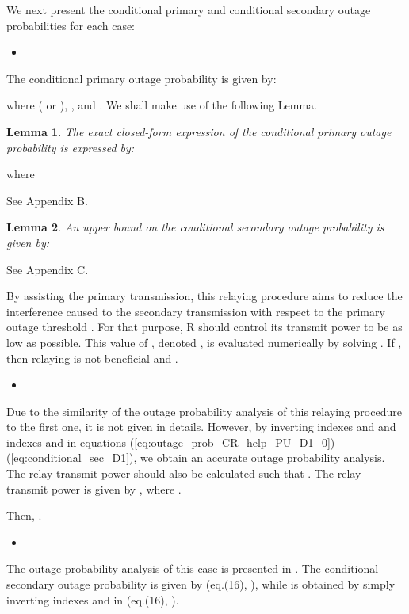 \documentclass[conference,twocolumn]{IEEEtran}
\newtheorem{Lemma}{Lemma}
\begin{document}
We next present the conditional primary and conditional secondary outage probabilities for each case:
\begin{itemize}
  \item 
\end{itemize}
The conditional primary outage probability is given by:

where  ( or ),
,  and
. We shall make use of the
following Lemma.
\begin{Lemma}
The exact closed-form expression of the conditional primary outage probability is expressed by:
\label{Lemma1}

\end{Lemma}
where

\begin{IEEEproof} See Appendix B.
\end{IEEEproof}
\begin{Lemma}
An upper bound on the conditional secondary outage probability is given by:
\label{Lemma2}

\end{Lemma}
\begin{IEEEproof} See Appendix C.
\end{IEEEproof}

By assisting the primary transmission, this relaying procedure aims to reduce the interference caused to the secondary transmission with respect to the primary outage threshold . For that purpose, R should control its transmit power  to be as low as possible. This value of , denoted , is evaluated numerically by solving . If , then relaying is not beneficial and .

\begin{itemize}
  \item 
\end{itemize}
Due to the similarity of the outage probability analysis of this relaying procedure to the first one, it is not given in details. However, by inverting indexes  and  and indexes  and  in equations (\ref{eq:outage_prob_CR_help_PU_D1_0})-(\ref{eq:conditional_sec_D1}), we obtain an accurate outage probability analysis. The relay transmit power should also be calculated such that . The relay transmit power is given by
, where
.

Then, .




\begin{itemize}
  \item 
\end{itemize}
The outage probability analysis of this case is presented in \cite{Jaafar_Globecom}. The conditional secondary outage probability is given by (eq.(16), \cite{Jaafar_Globecom}), while  is obtained by simply inverting indexes  and  in (eq.(16), \cite{Jaafar_Globecom}).
\end{document}
